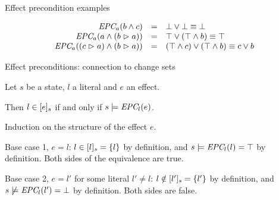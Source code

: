 \documentclass{gkibeamer}
\begin{document}
\begin{frame}{Effect precondition examples}
  \begin{example}
    \[
      \begin{array}{rcl}
        \textit{EPC}_{a}(b \land c) & =
        & \bot \lor \bot \equiv \bot \\
        \textit{EPC}_{a}(a \land (b \vartriangleright a)) & =
        & \top \lor (\top \land b) \equiv \top \\
        \textit{EPC}_{a}((c \vartriangleright a) \land (b \vartriangleright a)) & = &
        (\top \land c) \lor (\top \land b) \equiv c \lor b \\
      \end{array}
    \]
  \end{example}
\end{frame}

\begin{frame}{Effect preconditions: connection to change sets}
  \begin{lemma}[A]
    Let $s$ be a state, $l$ a literal and $e$ an effect.

    Then $l \in \lbrack e\rbrack_{s}$ if and only if $s \models
    \textit{EPC}_{l}(e)$.
  \end{lemma}

  \begin{proofstart}
    Induction on the structure of the effect $e$.
    \pause

    Base case 1, $e = l$:
    $l \in \lbrack l\rbrack_{s} = \{l\}$ by definition,
    and $s \models \textit{EPC}_{l}(l) = \top$ by definition.
    Both sides of the equivalence are true.
    \pause

    Base case 2, $e = l'$ for some literal $l'\neq l$:
    $l \notin \lbrack l'\rbrack_{s} = \{l'\}$ by definition,
    and $s \not\models \textit{EPC}_{l}(l') = \bot$ by definition.
    Both sides are false.
  \end{proofstart}
\end{frame}
\end{document}
